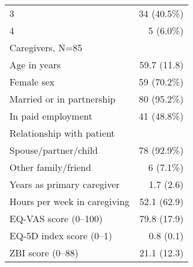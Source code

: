 \begin{table}[!h]
\begin{tabular}{ll}
\multicolumn{1}{l}{\hspace{2em}3} &
  \multicolumn{1}{r}{34 (40.5\%)} \\
\multicolumn{1}{l}{\hspace{2em}4} &
  \multicolumn{1}{r}{5 (6.0\%)} \\
\multicolumn{1}{l}{Caregivers, N=85} &
  \multicolumn{1}{r}{} \\
\multicolumn{1}{l}{\hspace{1em}Age in years} &
  \multicolumn{1}{r}{59.7 (11.8)} \\
\multicolumn{1}{l}{\hspace{1em}Female sex} &
  \multicolumn{1}{r}{59 (70.2\%)} \\
\multicolumn{1}{l}{\hspace{1em}Married or in partnership} &
  \multicolumn{1}{r}{80 (95.2\%)} \\
\multicolumn{1}{l}{\hspace{1em}In paid employment} &
  \multicolumn{1}{r}{41 (48.8\%)} \\
\multicolumn{1}{l}{\hspace{1em}Relationship with patient} &
  \multicolumn{1}{r}{} \\
\multicolumn{1}{l}{\hspace{2em}Spouse/partner/child} &
  \multicolumn{1}{r}{78 (92.9\%)} \\
\multicolumn{1}{l}{\hspace{2em}Other family/friend} &
  \multicolumn{1}{r}{6 (7.1\%)} \\
\multicolumn{1}{l}{\hspace{1em}Years as primary caregiver} &
  \multicolumn{1}{r}{1.7 (2.6)} \\
\multicolumn{1}{l}{\hspace{1em}Hours per week in caregiving} &
  \multicolumn{1}{r}{52.1 (62.9)} \\
\multicolumn{1}{l}{\hspace{1em}EQ-VAS score (0–100)} &
  \multicolumn{1}{r}{79.8 (17.9)} \\
\multicolumn{1}{l}{\hspace{1em}EQ-5D index score (0–1)} &
  \multicolumn{1}{r}{0.8 (0.1)} \\
\multicolumn{1}{l}{\hspace{1em}ZBI score (0–88)} &
  \multicolumn{1}{r}{21.1 (12.3)} \\
\cline{1-2}
\end{tabular}
\end{table}
